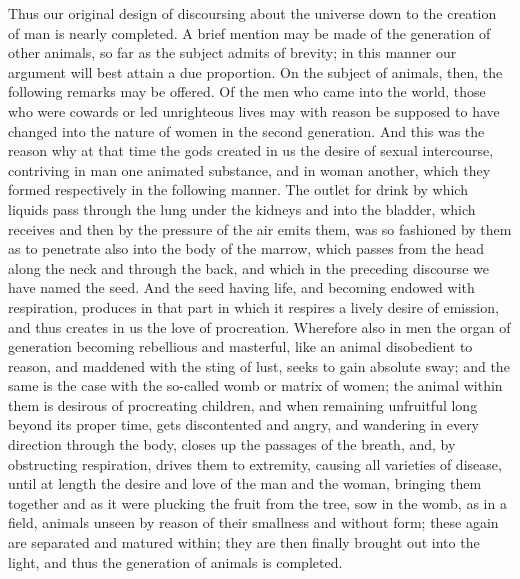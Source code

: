 Thus our original design of discoursing about the universe down to the
creation of man is nearly completed. A brief mention may be made of the
generation of other animals, so far as the subject admits of brevity; in
this manner our argument will best attain a due proportion. On the subject
of animals, then, the following remarks may be offered. Of the men who
came into the world, those who were cowards or led unrighteous lives may
with reason be supposed to have changed into the nature of women in the
second generation. And this was the reason why at that time the gods
created in us the desire of sexual intercourse, contriving in man one
animated substance, and in woman another, which they formed respectively
in the following manner. The outlet for drink by which liquids pass
through the lung under the kidneys and into the bladder, which receives
and then by the pressure of the air emits them, was so fashioned by them
as to penetrate also into the body of the marrow, which passes from the
head along the neck and through the back, and which in the preceding
discourse we have named the seed. And the seed having life, and becoming
endowed with respiration, produces in that part in which it respires a
lively desire of emission, and thus creates in us the love of procreation.
Wherefore also in men the organ of generation becoming rebellious and
masterful, like an animal disobedient to reason, and maddened with the
sting of lust, seeks to gain absolute sway; and the same is the case with
the so-called womb or matrix of women; the animal within them is desirous
of procreating children, and when remaining unfruitful long beyond its
proper time, gets discontented and angry, and wandering in every direction
through the body, closes up the passages of the breath, and, by
obstructing respiration, drives them to extremity, causing all varieties
of disease, until at length the desire and love of the man and the woman,
bringing them together and as it were plucking the fruit from the tree,
sow in the womb, as in a field, animals unseen by reason of their
smallness and without form; these again are separated and matured within;
they are then finally brought out into the light, and thus the generation
of animals is completed.

